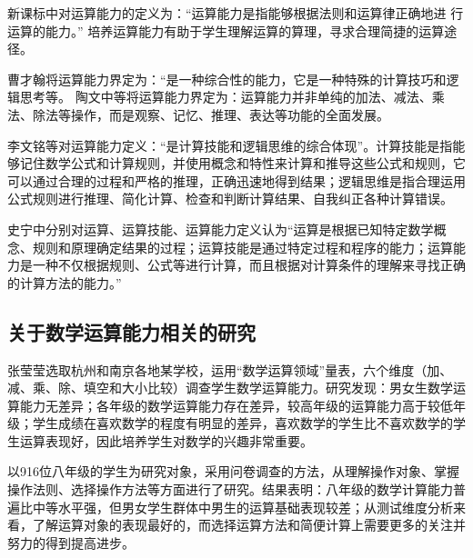 

新课标中对运算能力的定义为：“运算能力是指能够根据法则和运算律正确地进
行运算的能力。”\cite{张劲2021提高运算观察能力} 培养运算能力有助于学生理解运算的算理，寻求合理简捷的运算途径\cite{赵云峰2012培养学生的运算能力初探}。

曹才翰将运算能力界定为：“是一种综合性的能力，它是一种特殊的计算技巧和逻辑思考等。
陶文中等将运算能力界定为：运算能力并非单纯的加法、减法、乘法、除法等操作，而是观察、记忆、推理、表达等功能的全面发展。

李文铭等对运算能力定义：“是计算技能和逻辑思维的综合体现”。计算技能是指能够记住数学公式和计算规则，并使用概念和特性来计算和推导这些公式和规则，它可以通过合理的过程和严格的推理，正确迅速地得到结果；逻辑思维是指合理运用公式规则进行推理、简化计算、检查和判断计算结果、自我纠正各种计算错误\cite{林瑜提升民族地区西藏高中生数学运算素养的策略研究}。

史宁中分别对运算、运算技能、运算能力定义认为“运算是根据已知特定数学概念、规则和原理确定结果的过程；运算技能是通过特定过程和程序的能力；运算能力是一种不仅根据规则、公式等进行计算，而且根据对计算条件的理解来寻找正确的计算方法的能力。”\cite{杨茹冰2021高中生数学运算素养的现状}


\subsection{关于数学运算能力相关的研究}

张莹莹选取杭州和南京各地某学校，运用“数学运算领域”量表，六个维度（加、减、乘、除、填空和大小比较）调查学生数学运算能力。研究发现：男女生数学运算能力无差异；各年级的数学运算能力存在差异，较高年级的运算能力高于较低年级；学生成绩在喜欢数学的程度有明显的差异，喜欢数学的学生比不喜欢数学的学生运算表现好，因此培养学生对数学的兴趣非常重要。

以916位八年级的学生为研究对象，采用问卷调查的方法，从理解操作对象、掌握操作法则、选择操作方法等方面进行了研究。结果表明：八年级的数学计算能力普遍比中等水平强，但男女学生群体中男生的运算基础表现较差；从测试维度分析来看，了解运算对象的表现最好的，而选择运算方法和简便计算上需要更多的关注并努力的得到提高进步。

